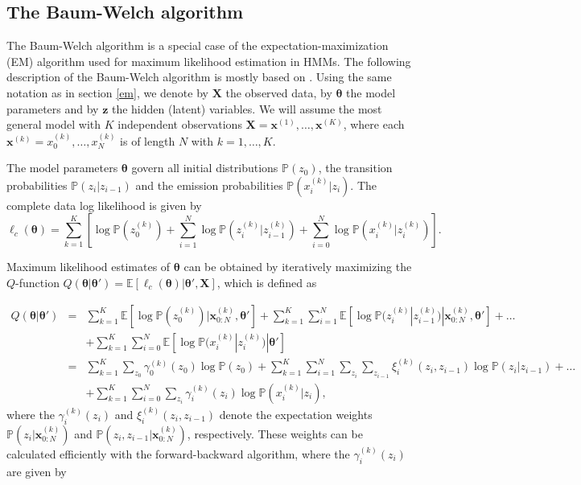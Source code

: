 \documentclass[a4paper,11pt]{article}
\def\X{\boldsymbol{X}}
\def\x{\boldsymbol{x}}
\def\z{\boldsymbol{z}}
\def\btheta{\boldsymbol{\theta}}
\def\l{\ell}
\def\p{\mathbb{P}}
\def\E{\mathbb{E}}
\begin{document}
\subsection{The Baum-Welch algorithm}

The Baum-Welch algorithm is a special case of the expectation-maximization (EM) algorithm used for maximum likelihood estimation in HMMs. The following description of the Baum-Welch algorithm is mostly based on \citet{Wegmann2019}. Using the same notation as in section \ref{em}, we denote by $\X$ the observed data, by $\btheta$ the model parameters and by $\z$ the hidden (latent) variables. We will assume the most general model with $K$ independent observations $\X = \x^{(1)}, \ldots, \x^{(K)}$, where each $\x^{(k)} = x_0^{(k)}, \ldots, x_N^{(k)}$ is of length $N$ with $k = 1, \ldots, K$.

The model parameters $\btheta$ govern all initial distributions $\p(z_0)$, the transition probabilities $\p(z_i | z_{i-1})$ and the emission probabilities $\p(x_i^{(k)} | z_i)$. The complete data log likelihood is given by
\begin{equation*}
 \l_c(\btheta) = \sum_{k=1}^K \left[ \log \p(z_0^{(k)}) + \sum_{i=1}^N \log \p(z_i^{(k)} | z_{i-1}^{(k)}) + \sum_{i=0}^N \log \p(x_i^{(k)} | z_i^{(k)}) \right].
\end{equation*}

Maximum likelihood estimates of $\btheta$ can be obtained by iteratively maximizing the $Q$-function $Q(\btheta | \btheta')=\E[\l_c(\btheta)|\btheta', \X]$, which is defined as

\begin{eqnarray*}
Q(\btheta | \btheta') &=& \sum_{k=1}^K \E\left[\log \p(z_0^{(k)}) | \x_{0:N}^{(k)}, \btheta'\right] + \sum_{k=1}^K \sum_{i=1}^N \E\left[\log \p(z_i^{(k)} | z_{i-1}^{(k)}) | \x_{0:N}^{(k)}, \btheta'\right] + \ldots\\
&& + \sum_{k=1}^K \sum_{i=0}^N \E\left[\log \p(x_i^{(k)} | z_i^{(k)}) | \btheta'\right]\\
&=& \sum_{k=1}^K \sum_{z_0}\gamma_0^{(k)}(z_0)\log\p(z_0)  + \sum_{k=1}^K \sum_{i=1}^N \sum_{z_i}\sum_{z_{i-1}}\xi_i^{(k)}(z_i, z_{i-1})\log\p(z_i | z_{i-1})  + \ldots\\
&& + \sum_{k=1}^K \sum_{i=0}^N\sum_{z_i}\gamma_i^{(k)}(z_i)\log \p(x_i^{(k)} | z_i),
\end{eqnarray*}
where the $\gamma_i^{(k)}(z_i)$ and $\xi_i^{(k)}(z_i, z_{i-1})$ denote the expectation weights $\p(z_i|\x_{0:N}^{(k)})$ and $\p(z_i, z_{i-1}| \x_{0:N}^{(k)})$, respectively. These weights can be calculated efficiently with the forward-backward algorithm, where the $\gamma_i^{(k)}(z_i)$ are given by
\end{document}
